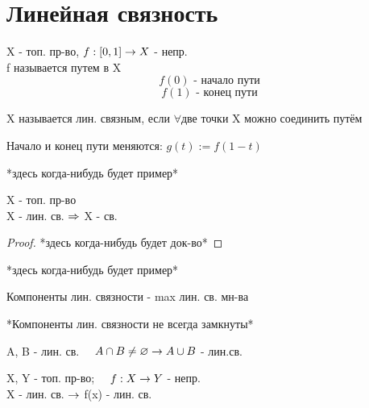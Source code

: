 \documentclass[geometry.tex]{subfiles}
\begin{document}
  \section{Линейная связность}

  \begin{definition}
      X - топ. пр-во, $f: [0,1] \rightarrow X$ - непр.\\
      f называется путем в X
      \[f(0) \text{ - начало пути}\]
      \[f(1) \text{ - конец пути}\]
  \end{definition}

  \begin{definition}
      X называется лин. связным, если $\forall$две точки X можно соединить путём
  \end{definition}

  \begin{remark}
      Начало и конец пути меняются: $g(t) := f(1-t)$
  \end{remark}

  \begin{example}
      *здесь когда-нибудь будет пример*
  \end{example}

  \begin{theorem}
      X - топ. пр-во\\
      X - лин. св. $\Rightarrow$ X - св.
  \end{theorem}

  \begin{proof}
      *здесь когда-нибудь будет док-во*
  \end{proof}

  \begin{example}
      *здесь когда-нибудь будет пример*
  \end{example}

  \begin{definition}
      Компоненты лин. связности - max лин. св. мн-ва
  \end{definition}

  \begin{remark}
      *Компоненты лин. связности не всегда замкнуты*
  \end{remark}

  \begin{ttheorem}
      A, B - лин. св.  $\quad A \cap B \neq \varnothing \rightarrow A \cup B$ - лин.св.
  \end{ttheorem}

  \begin{ttheorem}
      X, Y - топ. пр-во; $\quad f: X \rightarrow Y$ - непр.\\
      X - лин. св. $\rightarrow$ f(x) - лин. св.
  \end{ttheorem}
\end{document}
